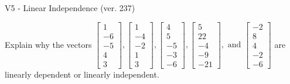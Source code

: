 \begin{exercise}
  \begin{exerciseTitle}V5 - Linear Independence (ver. 237)\end{exerciseTitle}
  \begin{exerciseStatement}
    Explain why the vectors \(\left[\begin{array}{r}
1 \\
-6 \\
-5 \\
4 \\
3
\end{array}\right] , \left[\begin{array}{r}
1 \\
-4 \\
-2 \\
1 \\
3
\end{array}\right] , \left[\begin{array}{r}
4 \\
5 \\
-5 \\
-3 \\
-6
\end{array}\right] , \left[\begin{array}{r}
5 \\
22 \\
-4 \\
-9 \\
-21
\end{array}\right] , \text{ and } \left[\begin{array}{r}
-2 \\
8 \\
4 \\
-2 \\
-6
\end{array}\right]\) are linearly dependent or linearly independent.	



\end{exerciseStatement}
\end{exercise}
